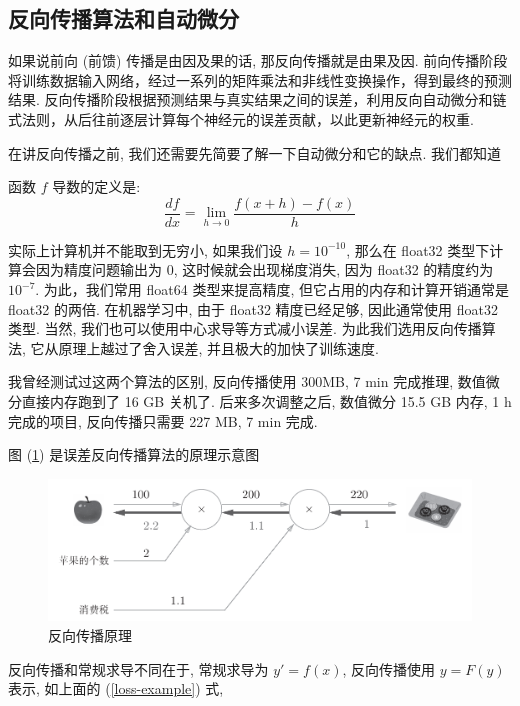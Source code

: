 \subsection{反向传播算法和自动微分}
如果说前向 (前馈) 传播是由因及果的话, 那反向传播就是由果及因. 前向传播阶段将训练数据输入网络，经过一系列的矩阵乘法和非线性变换操作，得到最终的预测结果. 反向传播阶段根据预测结果与真实结果之间的误差，利用反向自动微分和链式法则，从后往前逐层计算每个神经元的误差贡献，以此更新神经元的权重. 

在讲反向传播之前, 我们还需要先简要了解一下自动微分和它的缺点. 我们都知道 
\begin{definition}函数 $ f $ 导数的定义是: 
    \begin{equation}
        \frac{d f}{d x} = \lim_{h \to 0} \frac{ f(x + h) - f(x) }{h} 
    \end{equation}
\end{definition}

实际上计算机并不能取到无穷小, 如果我们设 $h = 10^{-10}$, 那么在 float32 类型下计算会因为精度问题输出为 0, 这时候就会出现梯度消失, 因为 float32 的精度约为 $10^{-7}$. 为此，我们常用 float64 类型来提高精度, 但它占用的内存和计算开销通常是 float32 的两倍. 在机器学习中, 由于 float32 精度已经足够, 因此通常使用 float32 类型. 当然, 我们也可以使用中心求导等方式减小误差. 为此我们选用反向传播算法, 它从原理上越过了舍入误差, 并且极大的加快了训练速度. 
\begin{remark}
    我曾经测试过这两个算法的区别, 反向传播使用 300MB, 7 min 完成推理, 数值微分直接内存跑到了 16 GB 关机了. 后来多次调整之后, 数值微分 15.5 GB 内存, 1 h 完成的项目, 反向传播只需要 227 MB, 7 min 完成.
\end{remark}

图 (\ref{fig:BP-theory}) 是误差反向传播算法的原理示意图
\begin{figure}[htbp]
    \centering
    \includegraphics{images/bp-theory.png}
    \caption{反向传播原理}\label{fig:BP-theory}
\end{figure}

反向传播和常规求导不同在于, 常规求导为 $ y' = f(x) $, 反向传播使用 $ y = F(y) $ 表示, 如上面的 (\ref{loss-example}) 式, 

